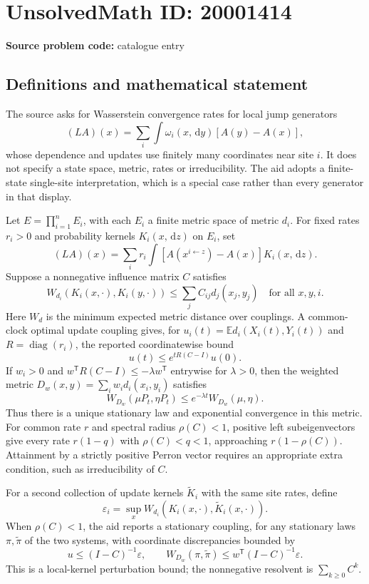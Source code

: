 \documentclass[11pt]{article}
\newcommand{\E}{\mathbb{E}}
\newcommand{\dd}{\,\mathrm{d}}
\begin{document}
\section*{UnsolvedMath ID: 20001414}
\textbf{Source problem code:} catalogue entry
\subsection{Definitions and mathematical statement}
The source asks for Wasserstein convergence rates for local jump generators
\[
 (LA)(x)=\sum_i\int\omega_i(x,\dd y)[A(y)-A(x)],
\]
whose dependence and updates use finitely many coordinates near site \(i\). It does not specify a state space, metric, rates or irreducibility. The aid adopts a finite-state single-site interpretation, which is a special case rather than every generator in that display.

Let \(E=\prod_{i=1}^nE_i\), with each \(E_i\) a finite metric space of metric \(d_i\). For fixed rates \(r_i>0\) and probability kernels \(K_i(x,\dd z)\) on \(E_i\), set
\[
 (LA)(x)=\sum_i r_i\int[A(x^{i\leftarrow z})-A(x)]K_i(x,\dd z).
\]
Suppose a nonnegative influence matrix \(C\) satisfies
\[
 W_{d_i}(K_i(x,\cdot),K_i(y,\cdot))\leq\sum_jC_{ij}d_j(x_j,y_j)
 \quad\text{for all }x,y,i.
\]
Here \(W_d\) is the minimum expected metric distance over couplings. A common-clock optimal update coupling gives, for \(u_i(t)=\E d_i(X_i(t),Y_i(t))\) and \(R=\operatorname{diag}(r_i)\), the reported coordinatewise bound
\[
 u(t)\leq e^{tR(C-I)}u(0).
\]
If \(w_i>0\) and \(w^{\mathsf T}R(C-I)\leq-\lambda w^{\mathsf T}\) entrywise for \(\lambda>0\), then the weighted metric \(D_w(x,y)=\sum_iw_id_i(x_i,y_i)\) satisfies
\[
 W_{D_w}(\mu P_t,\eta P_t)\leq e^{-\lambda t}W_{D_w}(\mu,\eta).
\]
Thus there is a unique stationary law and exponential convergence in this metric. For common rate \(r\) and spectral radius \(\rho(C)<1\), positive left subeigenvectors give every rate \(r(1-q)\) with \(\rho(C)<q<1\), approaching \(r(1-\rho(C))\). Attainment by a strictly positive Perron vector requires an appropriate extra condition, such as irreducibility of \(C\).

For a second collection of update kernels \(\widetilde K_i\) with the same site rates, define
\[
 \varepsilon_i=\sup_xW_{d_i}(K_i(x,\cdot),\widetilde K_i(x,\cdot)).
\]
When \(\rho(C)<1\), the aid reports a stationary coupling, for any stationary laws \(\pi,\widetilde\pi\) of the two systems, with coordinate discrepancies bounded by
\[
 u\leq(I-C)^{-1}\varepsilon,
 \qquad W_{D_w}(\pi,\widetilde\pi)\leq w^{\mathsf T}(I-C)^{-1}\varepsilon.
\]
This is a local-kernel perturbation bound; the nonnegative resolvent is \(\sum_{k\geq0}C^k\).
\end{document}
